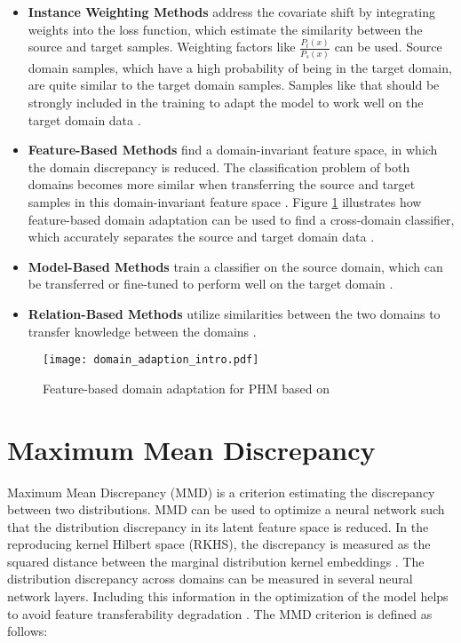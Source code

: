 \begin{itemize}
\item \textbf{Instance Weighting Methods} address the covariate shift by integrating weights into the loss function, which estimate the similarity between the source and target samples. Weighting factors like $\frac{P_{t}(x)}{P_{s}(x)}$ can be used. Source domain samples, which have a high probability of being in the target domain, are quite similar to the target domain samples. Samples like that should be strongly included in the training to adapt the model to work well on the target domain data \cite{AZAMFAR2020103932}.
\item \textbf{Feature-Based Methods} find a domain-invariant feature space, in which the domain discrepancy is reduced. The classification problem of both domains becomes more similar when transferring the source and target samples in this domain-invariant feature space \cite{AZAMFAR2020103932}. Figure \ref{fig:Domain_adaption_intro} illustrates how feature-based domain adaptation can be used to find a cross-domain classifier, which accurately separates the source and target domain data \cite{Pandhare2021}. 
\item \textbf{Model-Based Methods} train a classifier on the source domain, which can be transferred or fine-tuned to perform well on the target domain \cite{AZAMFAR2020103932}.
\item \textbf{Relation-Based Methods} utilize similarities between the two domains to transfer knowledge between the domains \cite{AZAMFAR2020103932}. 
\end{itemize}

\begin{figure}[H]
  \centering
  \texttt{[image: domain\_adaption\_intro.pdf]}
  \caption {Feature-based domain adaptation for PHM based on \cite{Pandhare2021}} \label{fig:Domain_adaption_intro}
\end{figure}


\section{Maximum Mean Discrepancy}
Maximum Mean Discrepancy (MMD) is a criterion estimating the discrepancy between two distributions. MMD can be used to optimize a neural network such that the distribution discrepancy in its latent feature space is reduced. In the reproducing kernel Hilbert space (RKHS), the discrepancy is measured as the squared distance between the marginal distribution kernel embeddings \cite{Pandhare2021}. The distribution discrepancy across domains can be measured in several neural network layers. Including this information in the optimization of the model helps to avoid feature transferability degradation \cite{li2020}. The MMD criterion is defined as follows:

